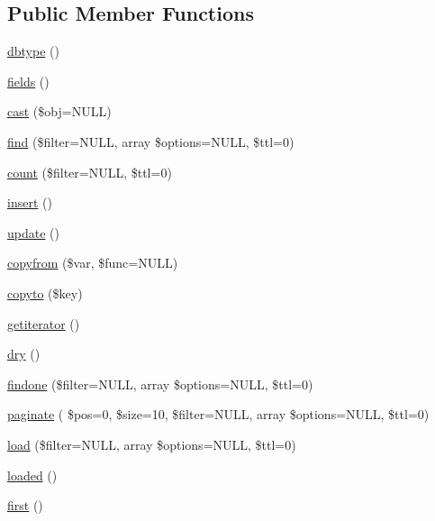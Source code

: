 \subsection*{Public Member Functions}
\begin{DoxyCompactItemize}
\item 
\hyperlink{class_d_b_1_1_cursor_a38948c2fb1711f49b72f123cbd91e611}{dbtype} ()
\item 
\hyperlink{class_d_b_1_1_cursor_a9dfc1601eaf8348bed6ba5622f725971}{fields} ()
\item 
\hyperlink{class_d_b_1_1_cursor_aa33294a722f17e6e4946223bb73f13ab}{cast} (\$obj=N\+U\+LL)
\item 
\hyperlink{class_d_b_1_1_cursor_a45e70f55799839fc0286bc94000924a7}{find} (\$filter=N\+U\+LL, array \$options=N\+U\+LL, \$ttl=0)
\item 
\hyperlink{class_d_b_1_1_cursor_ab1f3a3bd85dca49dceaea57f2fe21abf}{count} (\$filter=N\+U\+LL, \$ttl=0)
\item 
\hyperlink{class_d_b_1_1_cursor_a473241246338cfccc4709ba896749019}{insert} ()
\item 
\hyperlink{class_d_b_1_1_cursor_a842e4774e3b3601a005b995c02f7e883}{update} ()
\item 
\hyperlink{class_d_b_1_1_cursor_adffe904ab38af888d9b033647ec6d935}{copyfrom} (\$var, \$func=N\+U\+LL)
\item 
\hyperlink{class_d_b_1_1_cursor_a4bcf54f913758fb093c35ea81fc29615}{copyto} (\$key)
\item 
\hyperlink{class_d_b_1_1_cursor_a7f835c25df4cb49d02328644722656da}{getiterator} ()
\item 
\hyperlink{class_d_b_1_1_cursor_acc3a900450447c51540aaa9dec5959a4}{dry} ()
\item 
\hyperlink{class_d_b_1_1_cursor_abf73a1aa82ad1233b41388c0a4711c86}{findone} (\$filter=N\+U\+LL, array \$options=N\+U\+LL, \$ttl=0)
\item 
\hyperlink{class_d_b_1_1_cursor_a51889c022407cdc6cc565afa5ffe2715}{paginate} ( \$pos=0, \$size=10, \$filter=N\+U\+LL, array \$options=N\+U\+LL, \$ttl=0)
\item 
\hyperlink{class_d_b_1_1_cursor_a4db66c122e6274a3d653eff639e8476f}{load} (\$filter=N\+U\+LL, array \$options=N\+U\+LL, \$ttl=0)
\item 
\hyperlink{class_d_b_1_1_cursor_a3f07a4aa73e71d525744db933bc2aff4}{loaded} ()
\item 
\hyperlink{class_d_b_1_1_cursor_ac73eef9ff76ea330c0dab36ca448b90d}{first} ()
\item 

\end{DoxyCompactItemize}
